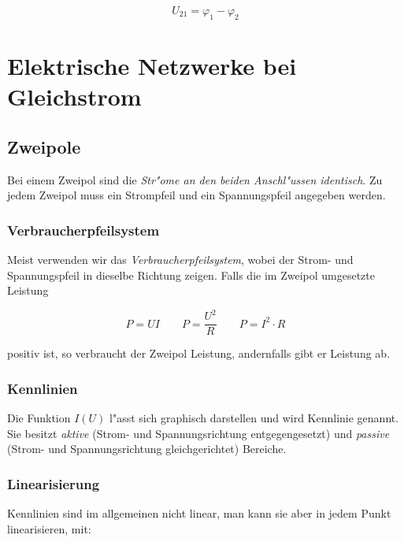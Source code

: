 \documentclass[german, 10pt, a4paper, headsepline]{scrreprt}
\theoremstyle{remark}
\begin{document}
\begin{displaymath}
	U_{21}=\varphi_1 -\varphi_2
\end{displaymath}

\chapter{Elektrische Netzwerke bei Gleichstrom}

\section{Zweipole}

Bei einem Zweipol sind die \textit{Str"ome an den beiden Anschl"ussen identisch}. Zu jedem Zweipol muss ein Strompfeil  und ein Spannungspfeil  angegeben werden.

\subsection{Verbraucherpfeilsystem}

Meist verwenden wir das \textit{Verbraucherpfeilsystem}, wobei der Strom- und Spannungspfeil in dieselbe Richtung zeigen. Falls die im Zweipol umgesetzte Leistung 

\begin{displaymath}
	P=UI \qquad P= \frac{U^2}{R} \qquad P = I^2\cdotp R
\end{displaymath}

positiv ist, so verbraucht der Zweipol Leistung, andernfalls gibt er Leistung ab.

\subsection{Kennlinien}

Die Funktion $I(U)$ l"asst sich graphisch darstellen und wird Kennlinie genannt. Sie besitzt \textit{aktive}  (Strom- und Spannungsrichtung entgegengesetzt) und \textit{passive}  (Strom- und Spannungsrichtung gleichgerichtet) Bereiche.

\subsection{Linearisierung}

Kennlinien sind im allgemeinen nicht linear, man kann sie aber in jedem Punkt linearisieren, mit:
\end{document}
